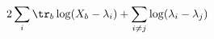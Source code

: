 \begin{equation}
2\sum_i\tr_b\log( X_b-\lambda_i) + \sum_{i\neq j} \log(\lambda_i-\lambda_j)
\end{equation}

